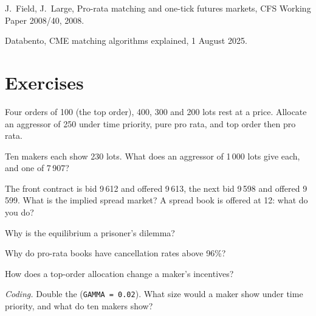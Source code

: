 \begin{omsources}
\item J.~Field, J.~Large, Pro-rata matching and one-tick futures markets, CFS Working Paper 2008/40, 2008.
\item Databento, CME matching algorithms explained, 1 August 2025.
\end{omsources}

\section{Exercises}

\begin{exercise}[$\star$]\label{exo:hf:futures-market-making:1}
Four orders of 100 (the top order), 400, 300 and 200 lots rest at a price. Allocate an aggressor of 250 under time priority, pure pro rata, and top
order then pro rata.
\end{exercise}

\begin{exercise}[$\star$]\label{exo:hf:futures-market-making:2}
Ten makers each show 230 lots. What does an aggressor of 1\,000 lots give each, and one of 7\,907?
\end{exercise}

\begin{exercise}[$\star$]\label{exo:hf:futures-market-making:3}
The front contract is bid 9\,612 and offered 9\,613, the next bid 9\,598 and offered 9\,599. What is the implied spread market? A spread book is offered at
12: what do you do?
\end{exercise}

\begin{exercise}[$\star\star$]\label{exo:hf:futures-market-making:4}
Why is the equilibrium a prisoner's dilemma?
\end{exercise}

\begin{exercise}[$\star\star$]\label{exo:hf:futures-market-making:5}
Why do pro-rata books have cancellation rates above 96\%?
\end{exercise}

\begin{exercise}[$\star\star$]\label{exo:hf:futures-market-making:6}
How does a top-order allocation change a maker's incentives?
\end{exercise}

\begin{exercise}[$\star\star\star$]\label{exo:hf:futures-market-making:7}
\emph{Coding.} Double the  (\texttt{GAMMA = 0.02}). What size would a maker show under time priority, and what do ten makers show?
\end{exercise}

